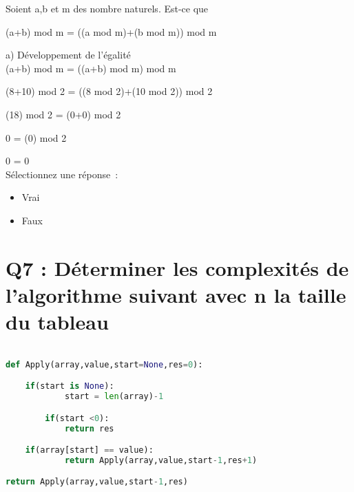 \vspace{5mm} %


Soient a,b et m des nombre naturels. Est-ce que

\vspace{2mm} %

(a+b) mod m = ((a mod m)+(b mod m)) mod m \\

\vspace{4mm} %

a) Développement de l'égalité \\

(a+b) mod m = ((a+b) mod m) mod m

(8+10) mod 2 = ((8 mod 2)+(10 mod 2)) mod 2

(18) mod 2 = (0+0) mod 2

0 = (0) mod 2

0 = 0 \\

Sélectionnez une réponse :
\begin{itemize}[label=$\square$]
\item Vrai
\item Faux
\end{itemize}


\newpage
\section{Q7 : Déterminer les complexités de l’algorithme suivant avec n la taille du tableau}

\vspace{5mm} %

\begin{lstlisting}[language=Python, caption=Python algorithme]

def Apply(array,value,start=None,res=0):

	if(start is None):
            start = len(array)-1

        if(start <0):
            return res

	if(array[start] == value):
            return Apply(array,value,start-1,res+1)

return Apply(array,value,start-1,res)
\end{lstlisting}

\vspace{5mm} %

